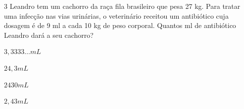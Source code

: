 









\num{3} Leandro tem um cachorro da raça fila brasileiro que pesa 27 kg. Para
tratar uma infecção nas vias urinárias, o veterinário receitou um
antibiótico cuja dosagem é de 9 ml a cada 10 kg de peso corporal.
Quantos ml de antibiótico Leandro dará a seu cachorro?

\begin{escolha}[itemsep=0pt]
\item $3,3333\ldots mL$
\item $24,3 mL$
\item $2430 mL$
\item $2,43 mL$
\end{escolha}





